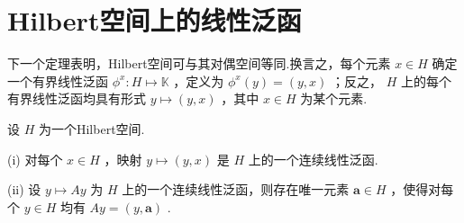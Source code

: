 \section{Hilbert空间上的线性泛函}

下一个定理表明，Hilbert空间可与其对偶空间等同.换言之，每个元素 $x \in  H$ 确定一个有界线性泛函 ${\phi }^{x} : H \mapsto  \mathbb{K}$ ，定义为 ${\phi }^{x}\left( y\right)  = \left( {y,x}\right)$ ；反之， $H$ 上的每个有界线性泛函均具有形式 $y \mapsto  \left( {y,x}\right)$ ，其中 $x \in  H$ 为某个元素.

\begin{theorem}[线性泛函的Riesz表示]\label{thm:riesz-representation-functional}
设 $H$ 为一个Hilbert空间.

(i) 对每个 $x \in  H$ ，映射 $y \mapsto  \left( {y,x}\right)$ 是 $H$ 上的一个连续线性泛函.

(ii) 设 $y \mapsto  {Ay}$ 为 $H$ 上的一个连续线性泛函，则存在唯一元素 $\bm{a} \in  H$ ，使得对每个 $y \in  H$ 均有 ${Ay} = \left( {y,\bm{a}}\right)$ .
\end{theorem}

